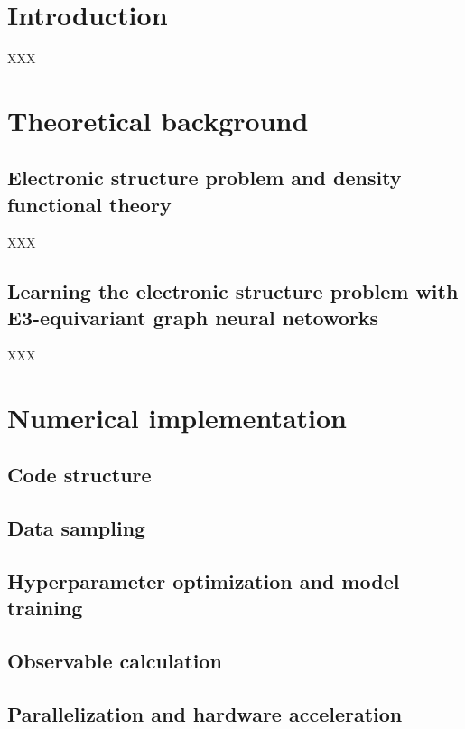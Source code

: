 \documentclass[preprint,12pt, compress]{elsarticle}
\begin{document}
\section{Introduction}
\label{s.introduction}

XXX


\section{Theoretical background}
\label{s.background}

\subsection{Electronic structure problem and density functional theory}
XXX

\subsection{Learning the electronic structure problem with E3-equivariant graph neural netoworks}
XXX




\section{Numerical implementation}
\label{s.implementation}

\subsection{Code structure}
\label{ss.code.structure}


\subsection{Data sampling}
\label{ss.data.sampling}



\subsection{Hyperparameter optimization and model training}
\label{ss.hyperparameters}


\subsection{Observable calculation}
\label{ss.observables}


\subsection{Parallelization and hardware acceleration}
\label{ss.parallelization}
\end{document}
